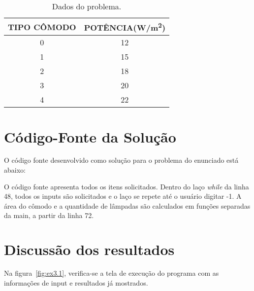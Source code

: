 \documentclass[
	12pt,				%
	openright,			%
	oneside,			%
	a4paper,			%
	chapter=TITLE,		%
	section=TITLE,		%
	english,			%
	french,				%
	spanish,			%
	brazil				%
	]{abntex2}
\begin{document}
	\begin{table}[htpb]
		\caption{Dados do problema.}
		\label{tab:table_2}
		\centering
		\begin{tabular}{c|c}
		\hline
		\multicolumn{1}{l|}{\textbf{TIPO CÔMODO}} & \multicolumn{1}{l}{\textbf{POTÊNCIA(\unit{W/m^2})}} \\ \hline
		0                                         & 12                                                                                    \\ \hline
		1                                         & 15                                                                                    \\ \hline
		2                                         & 18                                                                                    \\ \hline
		3                                         & 20                                                                                    \\ \hline
		4                                         & 22                                                                                    \\ \hline
		\end{tabular}
	\end{table}

\section[CÓDIGO-FONTE DA SOLUÇÃO]{Código-Fonte da Solução}

	O código fonte desenvolvido como solução para o problema do enunciado está abaixo:

		
	
	O código fonte apresenta todos os itens solicitados. Dentro do laço \emph{while} da linha 48, todos os inputs são solicitados e o laço se repete até o usuário digitar -1. A área do cômodo e a quantidade de lâmpadas são calculados em funções separadas da main, a partir da linha 72.

\section[DISCUSSÃO DOS RESULTADOS]{Discussão dos resultados}
	
	Na figura~\ref{fig:ex3.1}, verifica-se a tela de execução do programa com as informações de input e resultados já mostrados.
	
\end{document}
